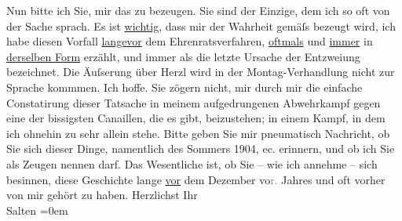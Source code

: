 \begin{ledgroupsized}[t]{13cm}
           Nun bitte ich Sie, mir das zu bezeugen. Sie sind der Einzige, dem ich so oft von der
               Sache sprach. Es ist \uline{wichtig}, dass mir der Wahrheit
               gemäſs bezeugt wird, ich habe diesen Vorfall \uline{lange}\uline{vor} dem Ehrenratsverfahren, \uline{oftmals} und \uline{immer} in \uline{der}{\pb}\uline{selben Form} erzählt, und immer als die letzte Ursache
               der Entzweiung bezeichnet. \pend
           \pstart
           Die Äuſserung über Herzl wird in der
               Montag-Verhandlung nicht zur Sprache kommmen. Ich hoffe. Sie zögern nicht, mir durch
                  \introOben{}mir\introOben{} die einfache Constatirung dieser Tatsache in meinem
               aufgedrungenen Abwehrkampf gegen eine der bissigsten Canaillen, die es gibt,
               beizustehen; in einem Kampf, in dem ich ohnehin zu sehr allein stehe. Bitte geben Sie
               mir pneumatisch Nachricht, ob Sie sich dieser Dinge, namentlich des Sommers
                  1904, ec. erinnern, und ob ich Sie als Zeugen nennen darf. Das Wesentliche
               ist, ob Sie – wie ich annehme – sich besinnen, diese Geschichte lange \uline{vor} dem Dezember vo\textcolor{gray}{r.} Jahres und
               oft vorher von mir gehört zu haben. \pend
           \pstart
           Herzlichst Ihr {\\[\baselineskip]}\spacefill\mbox{Salten}\pend
           \leftskip=0em{}
         
         \endnumbering{}\end{ledgroupsized}\begin{anhang}\end{anhang}\newcommand{\dateiname}{L03434}\newcommand{\titel}{Felix Salten an Arthur Schnitzler, [18.? 10. 1906]}\newcommand{\editorInnen}{Martin Anton Müller und Laura Untner}
      